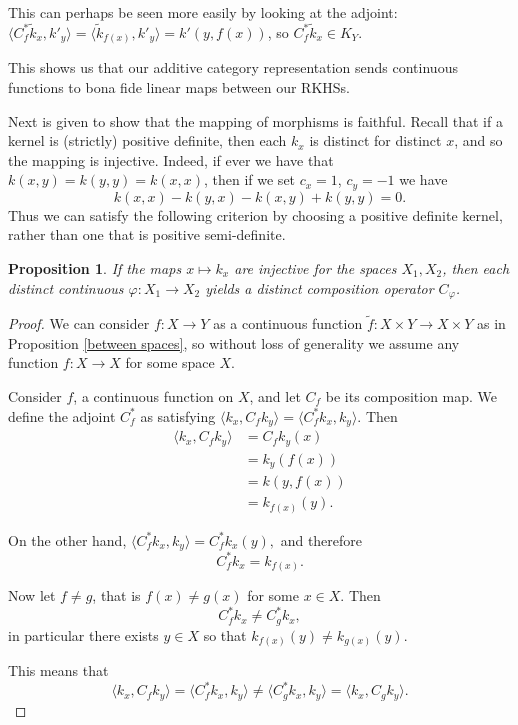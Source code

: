 \documentclass[12pt]{amsart}
\newtheorem{proposition}[theorem]{Proposition}
\theoremstyle{definition}
\numberwithin{equation}{section}
\begin{document}
This can perhaps be seen more easily by looking at the adjoint: $\langle C^*_f\tilde k_x, k'_y\rangle = \langle \tilde k_{f(x)}, k'_y \rangle =k'(y, f(x))$, so $C_f^*\tilde k_x \in K_Y$. 

This shows us that our additive category representation sends continuous functions to bona fide linear maps between our RKHSs. 


Next is given to show that the mapping of morphisms is faithful. Recall that if a kernel is (strictly) positive definite, then each $k_x$ is distinct for distinct $x$, and so the mapping is injective. Indeed, if ever we have that $k(x, y) = k(y,y)=k(x, x)$, then if we set $c_x = 1$, $c_y = -1$ we have 
\[k(x,x) -k(y, x) -k(x, y) + k(y, y) = 0.\]
Thus we can satisfy the following criterion by choosing a positive definite kernel, rather than one that is positive semi-definite.

\begin{proposition}
    If the maps $x\mapsto k_x$ are injective for the spaces $X_1, X_2$, then each distinct continuous $\varphi: X_1 \rightarrow X_2$ yields a distinct composition operator $C_\varphi$. 
\end{proposition}
\begin{proof}
     We can consider $f: X\rightarrow Y$ as a continuous function $\tilde f: X\times Y \rightarrow X\times Y$ as in Proposition \ref{between spaces}, so without loss of generality we assume any function $f : X\rightarrow X$ for some space $X$.
    
    Consider $f$, a continuous function on $X$, and let $ C_f$ be its composition map. We define the adjoint $C^*_f$ as satisfying $\langle k_x, C_fk_y\rangle = \langle C^*_fk_x, k_y\rangle$.  Then \[\begin{split}
        \langle k_x, C_fk_y\rangle &= C_fk_y(x) \\ &= k_y(f(x))\\&=k(y, f(x)) \\&=k_{f(x)}(y).
    \end{split}\]

    On the other hand, $
        \langle C^*_fk_x, k_y\rangle = C^*_fk_x(y),$
        and therefore \[C^*_fk_x = k_{f(x)}.\] 
        
        Now let $f \neq g$, that is $f(x) \neq g(x)$ for some $x \in X$. Then \[C^*_fk_x \neq C^*_gk_x,\]
        in particular there exists $y\in X$ so that $k_{f(x)}(y) \neq k_{g(x)}(y).$

        This means that \[\langle k_x, C_fk_y\rangle = \langle C^*_fk_x, k_y\rangle \neq \langle C^*_gk_x, k_y\rangle = \langle k_x, C_gk_y\rangle.\]
\end{proof}
\end{document}
